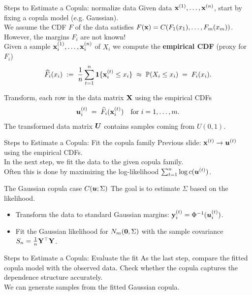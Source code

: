 \documentclass[11pt,handout,aspectratio=169]{beamer}
\begin{document}
\begin{frame}{Steps to Estimate a Copula: normalize data}
	Given data $\mathbf{x}^{(1)},\ldots,\mathbf{x}^{(n)}$, start by fixing a copula model (e.g. Gaussian).\\[3mm]
	
	We assume the CDF $F$ of the data satisfies $F(\mathbf{x})=C(F_1(x_1),\ldots,F_m(x_m))$.\\[3mm]
	
	However, \alert{the margins $F_i$ are not known!}\\[3mm]
	
	Given a sample $\mathbf{x}_i^{(1)},\ldots,\mathbf{x}_i^{(n)}$ of $X_i$ we compute the \textbf{empirical CDF} (proxy for $F_i$)
	$$
	\widehat F_i(x_i)\;:=\;\frac1n \sum_{t=1}^n \boldsymbol 1\{\mathbf{x}_i^{(t)}\leq x_i\}\;\approx\;\mathbb P(X_i\leq x_i)\;=\;F_i(x_i).
	$$
	\vspace{-5mm}
\begin{alertblock}{}
	Transform, each row in the data matrix $\mathbf{X}$ using the empirical CDFs
$$
\boldsymbol u^{(t)}_i\;=\;\widehat F_i(\mathbf{x}^{(t)}_i)\quad\mbox{for } i=1,\ldots,m.
$$
The transformed data matrix $\boldsymbol U$ contains samples coming from $U(0,1)$.
\end{alertblock}\end{frame}


\begin{frame}{Steps to Estimate a Copula: Fit the copula family}
Previous slide: \;\;$\mathbf{x}^{(t)}\to \boldsymbol u^{(t)}$ using the empirical CDFs.\\[5mm]
In the next step, we fit the data to the given copula family. \\[3mm]

Often this is done by maximizing the log-likelihood $\sum_{t=1}^n \log c(\boldsymbol u^{(t)})$.
\begin{block}{The Gaussian copula case $C(\boldsymbol u;\Sigma)$}
	The goal is to estimate $\Sigma$ based on the likelihood. 
\begin{itemize}
	\item Transform the data to standard Gaussian margins: $\mathbf{y}^{(t)}_i=\Phi^{-1}(\boldsymbol u^{(t)}_i)$.
	\item Fit the Gaussian likelihood for $N_m(\boldsymbol 0,\Sigma)$ with the sample covariance  $S_n=\tfrac1n \mathbf{Y}^\top \mathbf{Y}$.
\end{itemize}	
\end{block}
\end{frame}


\begin{frame}{Steps to Estimate a Copula: Evaluate the fit}
As the last step, compare the fitted copula model with the observed data. Check whether the copula captures the dependence structure accurately.\\[3mm]
We can generate samples from the fitted Gaussian copula.
\end{frame}
\end{document}
